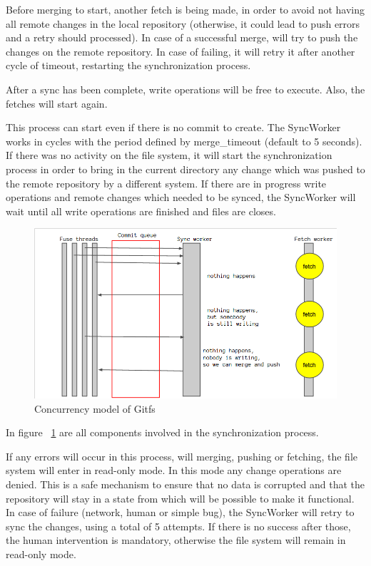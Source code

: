 Before merging to start, another fetch is being made, in order to avoid not having all remote changes in the local repository (otherwise, it could lead to push errors and a retry should processed). In case of a successful merge, will try to push the changes on the remote repository. In case of failing, it will retry it after another cycle of timeout, restarting the synchronization process.

After a sync has been complete, write operations will be free to execute. Also, the fetches will start again.

This process can start even if there is no commit to create. The SyncWorker works in cycles with the period defined by merge\_timeout (default to 5 seconds). If there was no activity on the file system, it will start the synchronization process in order to bring in the current directory any change which was pushed to the remote repository by a different system. If there are in progress write operations and remote changes which needed to be synced, the SyncWorker will wait until all write operations are finished and files are closes.

\begin{figure}[h]
  \begin{center}
    \includegraphics[width=16cm]{concurrency/gitfs.png}
  \end{center}
  \caption{Concurrency model of Gitfs}
  \label{fig:concurrency}
\end{figure}

In figure ~\ref{fig:concurrency} are all components involved in the synchronization process.

If any errors will occur in this process, will merging, pushing or fetching, the file system will enter in read-only mode. In this mode any change operations are denied. This is a safe mechanism to ensure that no data is corrupted and that the repository will stay in a state from which will be possible to make it functional. In case of failure (network, human or simple bug), the SyncWorker will retry to sync the changes, using a total of 5 attempts. If there is no success after those, the human intervention is mandatory, otherwise the file system will remain in read-only mode.

